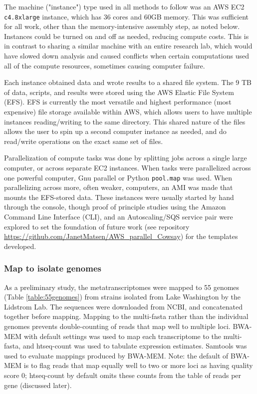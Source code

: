 The machine ("instance") type used in all methods to follow was an AWS EC2 \texttt{c4.8xlarge} instance, which has 36 cores and 60GB memory.
This was sufficient for all work, other than the memory-intensive assembly step, as noted below.
Instances could be turned on and off as needed, reducing compute costs.
This is in contrast to sharing a similar machine with an entire research lab, which would have slowed down analysis and caused conflicts when certain computations used all of the compute resources, sometimes causing computer failure.

Each instance obtained data and wrote results to a shared file system.
The 9 TB of data, scripts, and results were stored using the AWS Elastic File System (EFS).
EFS is currently the most versatile and highest performance (most expensive) file storage available within AWS, which allows users to have multiple instances reading/writing to the same directory.
This shared nature of the files allows the user to spin up a second computer instance as needed, and do read/write operations on the exact same set of files.

Parallelization of compute tasks was done by splitting jobs across a single large computer, or across separate EC2 instances.
When tasks were parallelized across one powerful computer, Gnu parallel or Python \texttt{pool.map} was used.
When parallelizing across more, often weaker, computers, an AMI was made that mounts the EFS-stored data.
These instances were usually started by hand through the console, though proof of principle studies using the Amazon Command Line Interface (CLI),
    and an Autoscaling/SQS service pair were explored to set the foundation of future work (see repository \url{https://github.com/JanetMatsen/AWS_parallel_Cowsay}) for the templates developed.

\subsubsection{Map to isolate genomes}  %
As a preliminary study, the metatranscriptomes were mapped to 55 genomes (Table \ref{table:55genomes}) from strains isolated from Lake Washington by the Lidstrom Lab.
The sequences were downloaded from NCBI, and concatenated together before mapping.
Mapping to the multi-fasta rather than the individual genomes prevents double-counting of reads that map well to multiple loci.
BWA-MEM \cite{li2009} with default settings was used to map each transcriptome to the multi-fasta, and htseq-count \cite{anders2014} was used to tabulate expression estimates.
Samtools \cite{li2009samtools} was used to evaluate mappings produced by BWA-MEM.
Note: the default of BWA-MEM is to flag reads that map equally well to two or more loci as having quality score 0; htseq-count by default omits these counts from the table of reads per gene (discussed later).

